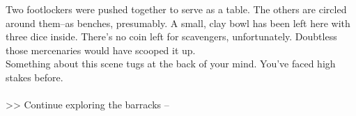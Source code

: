 Two footlockers were pushed together to serve as a table. The others are circled around them--as benches, presumably. A small, clay bowl has been left here with three dice inside. There’s no coin left for scavengers, unfortunately. Doubtless those mercenaries would have scooped it up.\\

Something about this scene tugs at the back of your mind. You’ve faced high stakes before.\\
\\

>> Continue exploring the barracks -- 